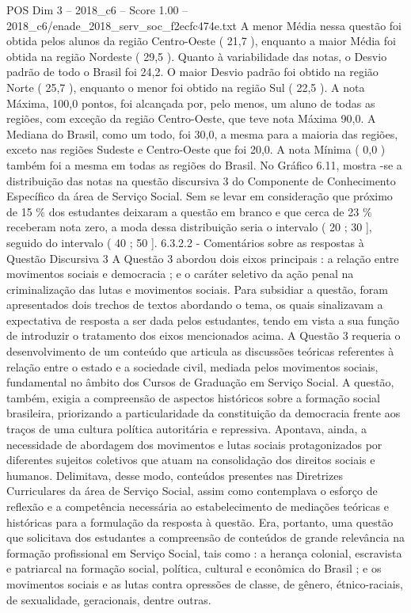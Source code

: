 \begin{textsample}{POS Dim 3 – 2018\_c6 – Score 1.00 – 2018\_c6/enade\_2018\_serv\_soc\_f2ecfc474e.txt}
A menor Média nessa questão foi obtida pelos alunos da região Centro-Oeste ( 21,7 ), enquanto a maior Média foi obtida na região Nordeste ( 29,5 ).
Quanto à variabilidade das notas, o Desvio padrão de todo o Brasil foi 24,2.
O maior Desvio padrão foi obtido na região Norte ( 25,7 ), enquanto o menor foi obtido na região Sul ( 22,5 ).
A nota Máxima, 100,0 pontos, foi alcançada por, pelo menos, um aluno de todas as regiões, com exceção da região Centro-Oeste, que teve nota Máxima 90,0.
A Mediana do Brasil, como um todo, foi 30,0, a mesma para a maioria das regiões, exceto nas regiões Sudeste e Centro-Oeste que foi 20,0.
A nota Mínima ( 0,0 ) também foi a mesma em todas as regiões do Brasil.
No Gráfico 6.11, mostra -se a distribuição das notas na questão discursiva 3 do Componente de Conhecimento Específico da área de Serviço Social.
Sem se levar em consideração que próximo de 15 \% dos estudantes deixaram a questão em branco e que cerca de 23 \% receberam nota zero, a moda dessa distribuição seria o intervalo ( 20 ; 30 ], seguido do intervalo ( 40 ; 50 ]. 6.3.2.2 - Comentários sobre as respostas à Questão Discursiva 3 A Questão 3 abordou dois eixos principais : a relação entre movimentos sociais e democracia ; e o caráter seletivo da ação penal na criminalização das lutas e movimentos sociais.
Para subsidiar a questão, foram apresentados dois trechos de textos abordando o tema, os quais sinalizavam a expectativa de resposta a ser dada pelos estudantes, tendo em vista a sua função de introduzir o tratamento dos eixos mencionados acima.
A Questão 3 requeria o desenvolvimento de um conteúdo que articula as discussões teóricas referentes à relação entre o estado e a sociedade civil, mediada pelos movimentos sociais, fundamental no âmbito dos Cursos de Graduação em Serviço Social.
A questão, também, exigia a compreensão de aspectos históricos sobre a formação social brasileira, priorizando a particularidade da constituição da democracia frente aos traços de uma cultura política autoritária e repressiva.
Apontava, ainda, a necessidade de abordagem dos movimentos e lutas sociais protagonizados por diferentes sujeitos coletivos que atuam na consolidação dos direitos sociais e humanos.
Delimitava, desse modo, conteúdos presentes nas Diretrizes Curriculares da área de Serviço Social, assim como contemplava o esforço de reflexão e a competência necessária ao estabelecimento de mediações teóricas e históricas para a formulação da resposta à questão.
Era, portanto, uma questão que solicitava dos estudantes a compreensão de conteúdos de grande relevância na formação profissional em Serviço Social, tais como : a herança colonial, escravista e patriarcal na formação social, política, cultural e econômica do Brasil ; e os movimentos sociais e as lutas contra opressões de classe, de gênero, étnico-raciais, de sexualidade, geracionais, dentre outras.

\end{textsample}
